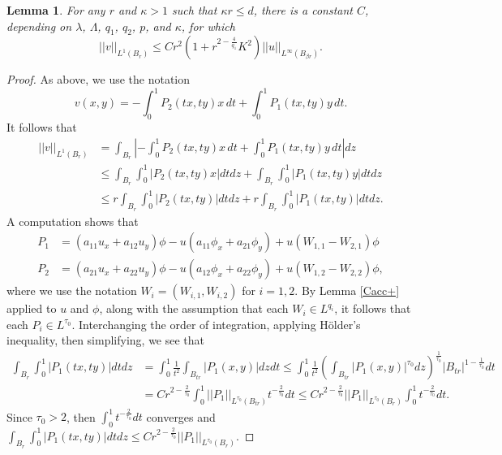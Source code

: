 \documentclass[12pt,reqno]{amsart}
\theoremstyle{plain}
\newtheorem{lem}{Lemma}
\theoremstyle{definition}
\newcommand{\disp}{\displaystyle}
\newcommand{\be}{\beta}
\newcommand{\la}{\lambda}
\newcommand{\La}{\Lambda}
\newcommand{\iny}{\infty}
\newcommand{\norm}[1]{\left\vert \left\vert #1\right\vert\right\vert}
\newcommand{\abs}[1]{\left\vert#1\right\vert}
\newcommand{\pr}[1]{\left( #1 \right) }
\begin{document}
\begin{lem}
For any $r$ and $\kappa > 1$ such that $\kappa r \le d$, there is a constant $C$, depending on $\la$, $\La$, $q_1$, $q_2$, $p$, and $\kappa$, for which 
$$\norm{v}_{L^1\pr{B_r}} \le C r^2 \pr{1 + r^{2 - \frac {4}{q_1} }K^2 } \norm{u}_{L^\iny\pr{B_{\be r}}}.$$
\label{tildevBd}
\end{lem}

\begin{proof}
As above, we use the notation
$$v\pr{x,y} = -\int_0^1P_2\pr{tx,ty} x \, dt +  \int_0^1 P_1\pr{tx,ty}y \, dt.$$
It follows that
\begin{align*}
\norm{ v}_{L^1\pr{B_r}}
&= \int_{B_r}\abs{-\int_0^1P_2\pr{tx,ty} x \, dt +  \int_0^1 P_1\pr{tx,ty}y \, dt} dz \\
&\le \int_{B_r} \int_0^1 \abs{P_2\pr{tx,ty} x } dt dz
+ \int_{B_r} \int_0^1 \abs{P_1\pr{tx,ty} y } dt dz \\
&\le r \int_{B_r} \int_0^1 \abs{P_2\pr{tx,ty}} dt dz
+ r \int_{B_r} \int_0^1 \abs{P_1\pr{tx,ty}} dt dz.
\end{align*}
A computation shows that
\begin{align*}
P_1 &= \pr{a_{11} u_x + a_{12} u_y} \phi - u \pr{a_{11} \phi_x + a_{21} \phi_y} + u \pr{W_{1,1}- W_{2,1}} \phi \\
P_2 &= \pr{a_{21} u_x + a_{22} u_y} \phi - u \pr{a_{12} \phi_x + a_{22} \phi_y} + u \pr{W_{1,2}- W_{2,2}} \phi,
\end{align*}
where we use the notation $W_i = \pr{W_{i,1}, W_{i,2}}$ for $i = 1, 2$.
By Lemma \ref{Cacc+} applied to $u$ and $\phi$, along with the assumption that each $W_i \in L^{q_i}$, it follows that each $P_i \in L^{\tau_0}$.
Interchanging the order of integration, applying H\"older's inequality, then simplifying, we see that
\begin{align*}
\int_{B_r} \int_0^1 \abs{P_1\pr{tx,ty}} dt dz
&= \int_0^1 \frac 1 {t^2} \int_{B_{tr}}  \abs{P_1\pr{x,y}} dz dt
\le \int_0^1 \frac 1 {t^2} \pr{\int_{B_{tr}} \abs{P_1\pr{x,y}}^{\tau_0} dz}^{\frac 1{\tau_0}} \abs{B_{tr}}^{1 - \frac{1}{\tau_0}}dt \\
&= C r^{2 - \frac{2}{\tau_0}} \int_0^1 \norm{P_1}_{L^{\tau_0}\pr{B_{tr}}} t^{ - \frac{2}{\tau_0}} dt
\le C r^{2 - \frac{2}{\tau_0}} \norm{P_1}_{L^{\tau_0}\pr{B_{r}}} \int_0^1 t^{ - \frac{2}{\tau_0}} dt.
\end{align*}
Since $\tau_0 > 2$, then $\disp \int_0^1 t^{ - \frac{2}{\tau_0}} dt$ converges and $\disp \int_{B_r} \int_0^1 \abs{P_1\pr{tx,ty}} dt dz \le C r^{2 - \frac{2}{\tau_0}} \norm{P_1}_{L^{\tau_0}\pr{B_{r}}}.$

\end{proof}
\end{document}
